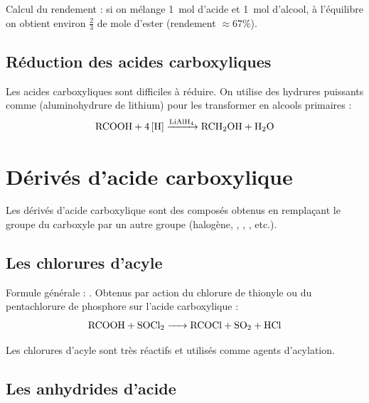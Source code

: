 \begin{exemple}
Calcul du rendement : si on mélange \SI{1}{\mol} d'acide et \SI{1}{\mol} d'alcool, à l'équilibre on obtient environ $\frac{2}{3}$ de mole d'ester (rendement $\approx 67\%$).
\end{exemple}

\subsection{Réduction des acides carboxyliques}

\begin{propriete}
Les acides carboxyliques sont difficiles à réduire. On utilise des hydrures puissants comme  (aluminohydrure de lithium) pour les transformer en alcools primaires :
\[
\ce{RCOOH + 4[H] ->[LiAlH4] RCH2OH + H2O}
\]
\end{propriete}

\section{Dérivés d'acide carboxylique}
\label{sec:derives}

\begin{definition}
Les dérivés d'acide carboxylique sont des composés obtenus en remplaçant le groupe  du carboxyle par un autre groupe (halogène, , , , etc.).
\end{definition}

\subsection{Les chlorures d'acyle}

\begin{propriete}
Formule générale : . Obtenus par action du chlorure de thionyle  ou du pentachlorure de phosphore  sur l'acide carboxylique :
\[
\ce{RCOOH + SOCl2 -> RCOCl + SO2 + HCl}
\]
\end{propriete}

\begin{remarque}
Les chlorures d'acyle sont très réactifs et utilisés comme agents d'acylation.
\end{remarque}

\subsection{Les anhydrides d'acide}


